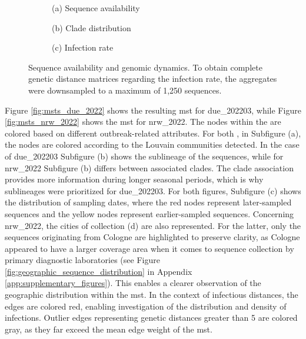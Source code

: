 \begin{figure}[ht!]
  \centering
  \begin{subfigure}[b]{0.32\textwidth}
    
    \caption*{(a) Sequence availability}
  \end{subfigure}
  \begin{subfigure}[b]{0.32\textwidth}
    
    \caption*{(b) Clade distribution}
  \end{subfigure}
    \begin{subfigure}[b]{0.32\textwidth}
    
    \caption*{(c) Infection rate}
  \end{subfigure}
  \caption[Sequence availability and genomic dynamics]{Sequence availability and genomic dynamics. To obtain complete genetic distance matrices regarding the infection rate, the aggregates were downsampled to a maximum of 1,250 sequences.}
  \label{fig:seasonal_and_geographical_impact}
\end{figure}

Figure \ref{fig:msts_due_2022} shows the resulting \acrshort{mst} for due\_202203, while Figure \ref{fig:msts_nrw_2022} shows the \acrshort{mst} for nrw\_2022. The nodes within the  are colored based on different outbreak-related attributes. For both , in Subfigure (a), the nodes are colored according to the Louvain communities detected. In the case of due\_202203 Subfigure (b) shows the sublineage of the sequences, while for nrw\_2022 Subfigure (b) differs between associated clades. The clade association provides more information during longer seasonal periods, which is why sublineages were prioritized for due\_202203. For both figures, Subfigure (c) shows the distribution of sampling dates, where the red nodes represent later-sampled sequences and the yellow nodes represent earlier-sampled sequences. Concerning nrw\_2022, the cities of collection (d) are also represented. For the latter, only the sequences originating from Cologne are highlighted to preserve clarity, as Cologne appeared to have a larger coverage area when it comes to sequence collection by primary diagnostic laboratories (see Figure \ref{fig:geographic_sequence_distribution} in Appendix \ref{app:supplementary_figures}). This enables a clearer observation of the geographic distribution within the \acrshort{mst}. 
In the context of infectious distances, the edges are colored red, enabling investigation of the distribution and density of infections. Outlier edges representing genetic distances greater than 5 are colored gray, as they far exceed the mean edge weight of the \acrshort{mst}.

